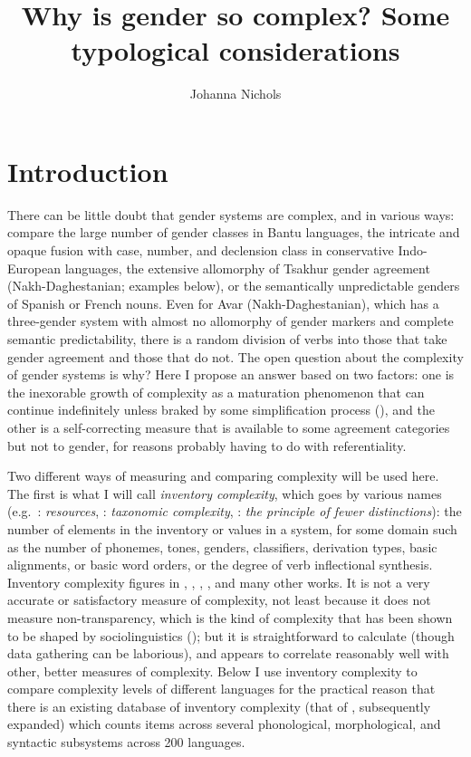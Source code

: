 \documentclass[output=collectionpaper]{langsci/langscibook}
\title{Why is gender so complex? Some typological considerations}
\author{%
Johanna Nichols
\affiliation{University of California, Berkeley}
}%
\begin{document}
\section{Introduction}
There can be little doubt that gender systems are complex, and in various ways: compare the large number of gender classes in Bantu languages, the intricate and opaque fusion with case, number, and declension class in conservative Indo-European languages, the extensive allomorphy of Tsakhur gender agreement (Nakh-Daghestanian; examples below), or the semantically unpredictable genders of Spanish or French nouns.  Even for Avar (Nakh-Daghestanian), which has a three-gender system with almost no allomorphy of gender markers and complete semantic predictability, there is a random division of verbs into those that take gender agreement and those that do not. The open question about the complexity of gender systems is why? Here I propose an answer based on two factors:  one is the inexorable growth of complexity as a maturation phenomenon that can continue indefinitely unless braked by some simplification process (\citealt{Dahl2004,Trudgill2011}), and the other is a self-correcting measure that is available to some agreement categories but not to gender, for reasons probably having to do with referentiality.

Two different ways of measuring and comparing complexity will be used here. The first is what I will call \textit{inventory complexity}, which goes by various names (e.g.\ \citealt{Dahl2004}: \textit{resources}, \citealt{Miestamo2008}: \textit{taxonomic complexity}, : \textit{the principle of fewer distinctions}): the number of elements in the inventory or values in a system, for some domain such as the number of phonemes, tones, genders, classifiers, derivation types, basic alignments, or basic word orders, or the degree of verb inflectional synthesis. Inventory complexity figures in \citet{Dahl2004}, \citet{Shosted2006}, \citet{Nichols2009}, \citet{Donohue2011}, and many other works. It is not a very accurate or satisfactory measure of complexity, not least because it does not measure non-transparency, which is the kind of complexity that has been shown to be shaped by sociolinguistics (\citealt{Trudgill2011}); but it is straightforward to calculate (though data gathering can be laborious), and appears to correlate reasonably well with other, better measures of complexity. Below I use inventory complexity to compare complexity levels of different languages for the practical reason that there is an existing database of inventory complexity (that of \citealt{Nichols2009}, subsequently expanded) which counts items across several phonological, morphological, and syntactic subsystems across 200 languages.
\end{document}
